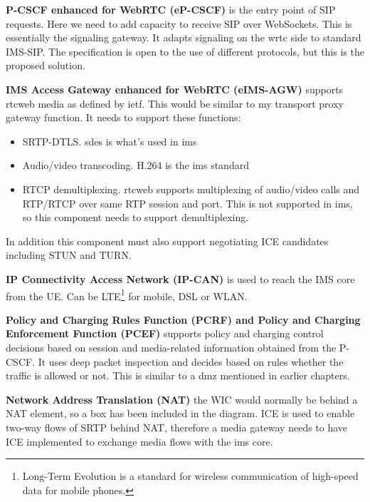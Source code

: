 \textbf{P-CSCF enhanced for WebRTC (eP-CSCF)}
is the entry point of SIP requests. Here we need to add capacity to receive SIP over WebSockets. This is essentially the signaling gateway. It adapts signaling on the \gls{wrtc} side to standard IMS-SIP. The specification is open to the use of different protocols, but this is the proposed solution.

\textbf{IMS Access Gateway enhanced for WebRTC (eIMS-AGW)}
supports \gls{rtcweb} media as defined by \gls{ietf}. This would be similar to my transport proxy gateway function. It needs to support these functions:
\begin{itemize}
\item{SRTP-DTLS. \gls{sdes} is what's used in \gls{ims}}
\item{Audio/video transcoding. H.264 is the \gls{ims} standard}
\item{RTCP demultiplexing. \gls{rtcweb} supports multiplexing of audio/video calls and RTP/RTCP over same RTP session and port. This is not supported in \gls{ims}, so this component needs to support demultiplexing.}
\end{itemize}

In addition this component must also support negotiating ICE candidates including STUN and TURN.

\textbf{IP Connectivity Access Network (IP-CAN)}
is used to reach the IMS core from the UE. Can be LTE\footnote{Long-Term Evolution is a standard for wireless communication of high-speed data for mobile phones.} for mobile, DSL or WLAN.

\textbf{Policy and Charging Rules Function (PCRF) and Policy and Charging Enforcement Function (PCEF)}
supports policy and charging control decisions based on session and media-related information obtained from the P-CSCF. It uses deep packet inspection and decides based on rules whether the traffic is allowed or not. This is similar to a \gls{dmz} mentioned in earlier chapters.

\textbf{Network Address Translation (NAT)}
the WIC would normally be behind a NAT element, so a box has been included in the diagram. ICE is used to enable two-way flows of SRTP behind NAT, therefore a media gateway needs to have ICE implemented to exchange media flows with the \gls{ims} core.


